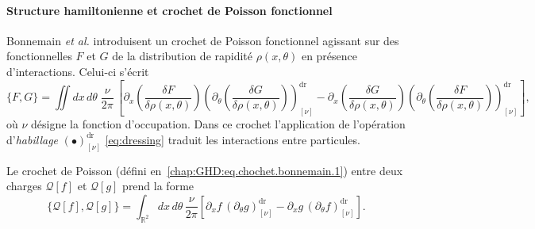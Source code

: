 \paragraph{Structure hamiltonienne et crochet de Poisson fonctionnel}  
Bonnemain \emph{et al.} \cite{bonnemain2024hamiltonian} introduisent un crochet de Poisson fonctionnel agissant sur des fonctionnelles $F$ et $G$ de la distribution de rapidité $\rho(x,\theta)$ en présence d’interactions. Celui-ci s’écrit
\begin{equation}\label{chap:GHD:eq.chochet.bonnemain.1}
	\{F,G\}
	=\iint dx\,d\theta\;\frac{\nu}{2\pi}\,
	\left[
		\partial_x \left( \frac{\delta F}{\delta \rho(x,\theta)} \right)
		\left( \partial_\theta \left( \frac{\delta G}{\delta \rho(x,\theta)} \right) \right)^{\mathrm{dr}}_{[\nu]}
		-
		\partial_x \left( \frac{\delta G}{\delta \rho(x,\theta)} \right)
		\left( \partial_\theta \left( \frac{\delta F}{\delta \rho(x,\theta)} \right) \right)^{\mathrm{dr}}_{[\nu]}
	\right],
\end{equation}
où $\nu$ désigne la fonction d’occupation. Dans ce crochet l'application de l’opération d’\emph{habillage} $(\bullet)^{\mathrm{dr}}_{[\nu]}$ \eqref{eq:dressing}  traduit les interactions entre particules.


\medskip


Le crochet de Poisson (défini en~\eqref{chap:GHD:eq.chochet.bonnemain.1}) entre deux charges $\mathcal{Q}[f]$ et $\mathcal{Q}[g]$ prend la forme
\begin{equation}\label{chap:GHD:eq.chochet.bonnemain.2}
	\{\mathcal{Q}[f], \mathcal{Q}[g]\}
	= \int_{\mathbb{R}^2} dx\, d\theta\, \frac{\nu}{2\pi} 
	\left[ \partial_x f \, (\partial_\theta g)^{\mathrm{dr}}_{[\nu]} 
	     - \partial_x g \, (\partial_\theta f)^{\mathrm{dr}}_{[\nu]} \right].
\end{equation}

\medskip

